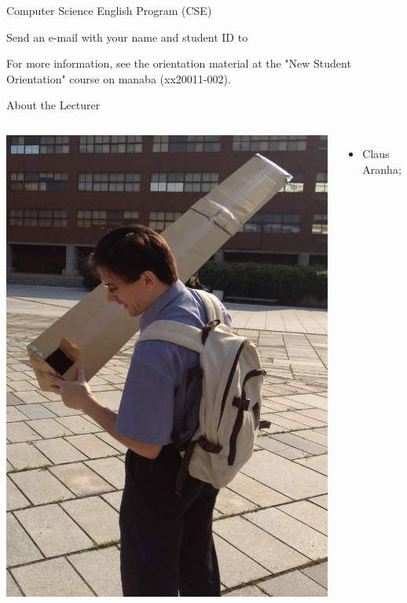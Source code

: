 \documentclass{beamer}
\begin{document}
\begin{CJK}{UTF8}{ipxm}
\begin{frame}{Computer Science English Program (CSE)}
  \begin{center}
    Send an e-mail with your name and student ID to\\
  \end{center}
  \bigskip

  For more information, see the orientation material at the
  "New Student Orientation" course on manaba (xx20011-002).
\end{frame}

\begin{frame}{About the Lecturer}
  \begin{columns}
    \includegraphics[width=1\textwidth]{../img/pinhole}
    {\small
    \begin{itemize}
      \item {} Claus Aranha;

\end{itemize}}
\end{columns}
\end{frame}
\end{CJK}
\end{document}
